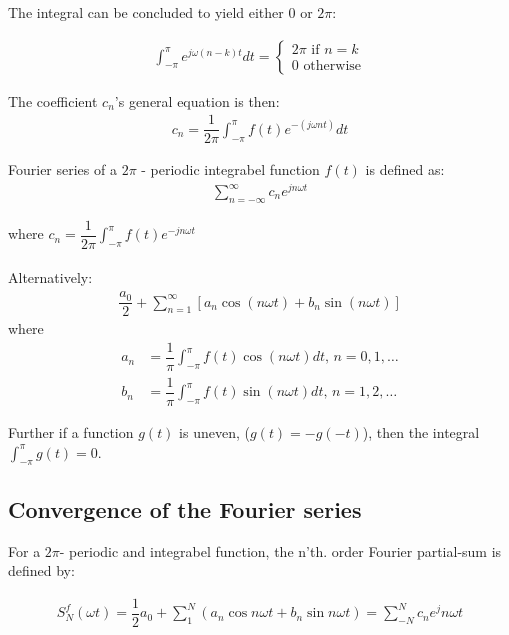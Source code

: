 The integral can be concluded to yield either $0$ or $2\pi$:

\begin{align}
	\int_{-\pi}^{\pi} e^{j \omega (n-k)t}dt 
	= 
	\begin{cases}
			2\pi \text{ if } n=k\\
			0 \text{ otherwise}
	\end{cases}
\end{align}

The coefficient $c_n$'s general equation is then:
\begin{align*}
	c_n = \dfrac{1}{2\pi} \int_{-\pi}^{\pi} f(t) e^{-(j \omega nt)}dt
\end{align*} 

\begin{definition}
Fourier series of a $2\pi$ - periodic integrabel function $f(t)$ is defined as:
\begin{align*}
	\sum_{n=-\infty}^\infty c_n e^{j n \omega t}
\end{align*}

where $c_n = \dfrac{1}{2\pi}\int_{- \pi}^\pi f(t) e^{-j n \omega t}$
\\\\
Alternatively:
\begin{align*}
	\dfrac{a_0}{2} + \sum_{n=1}^{\infty} \left[ a_n \cos(n \omega t) + b_n \sin(n \omega t)\right]
\end{align*} 
where
\begin{align*}
	a_n 
	&= \dfrac{1}{\pi} \int_{-\pi}^\pi f(t) \cos (n \omega t) dt, \, n=0,1,\dots\\
	b_n
	&= \dfrac{1}{\pi} \int_{-\pi}^\pi f(t) \sin (n \omega t) dt, \, n=1,2,\dots	
\end{align*}
\end{definition}

Further if a function $g(t)$ is uneven, ($g(t) = -g(-t)$), then the integral $\int_{-\pi}^\pi g(t) = 0$.

\subsection{Convergence of the Fourier series}
For a $2\pi$- periodic and integrabel function, the n'th. order Fourier partial-sum is defined by: 

\begin{align}\label{eq:partialsumFourierSeries}
	S_N^f(\omega t) = \dfrac{1}{2} a_0 + \sum_1^N\left(a_n \cos n\omega t + b_n \sin n \omega t \right) = \sum_{-N}^N c_n e^jn\omega t
\end{align}



